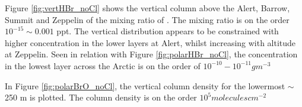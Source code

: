 \medskip

Figure \ref{fig:vertHBr_noCl} shows the vertical column above the Alert, Barrow, Summit and Zeppelin of the mixing ratio of . The mixing ratio is on the order $10^{-15} \sim 0.001$ ppt. The vertical distribution appears to be constrained with higher concentration in the lower layers at Alert, whilst increasing with altitude at Zeppelin. Seen in relation with Figure \ref{fig:polarHBr_noCl}, the concentration in the lowest layer across the Arctic is on the order of $10^{-10} - 10^{-11} g m^{-3}$

\medskip

In Figure \ref{fig:polarBrO_noCl}, the vertical column density for the lowermost $\sim$ 250 m is plotted. The column density is on the order $10^{5} molecules cm^{-2}$








%

%

%

%







